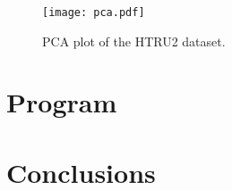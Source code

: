 \begin{figure}[b!]
    \centering
    \texttt{[image: pca.pdf]}
    \caption{PCA plot of the HTRU2 dataset.}
    \label{fig:pca}
\end{figure}
\section{Program}

\section{Conclusions}
